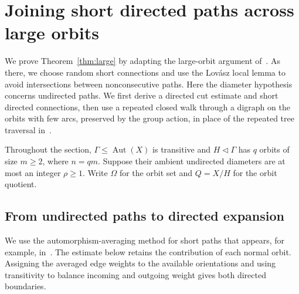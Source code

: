 \documentclass[11pt,a4paper,reqno]{amsart}
\theoremstyle{definition}
\theoremstyle{remark}
\numberwithin{equation}{section}
\DeclareMathOperator{\Aut}{Aut}
\begin{document}
\section{Joining short directed paths across large orbits}\label{sec:large}
We prove Theorem~\ref{thm:large} by adapting the large-orbit argument of~\cite[Lemmas 4.2, 4.5 and 4.6]{LiMethuku}. As there, we choose random short connections and use the Lov\'asz local lemma to avoid intersections between nonconsecutive paths. Here the diameter hypothesis concerns undirected paths. We first derive a directed cut estimate and short directed connections, then use a repeated closed walk through a digraph on the orbits with few arcs, preserved by the group action, in place of the repeated tree traversal in~\cite{LiMethuku}.

Throughout the section, $\Gamma\le\Aut(X)$ is transitive and $H\lhd\Gamma$ has $q$ orbits of size $m\ge2$, where $n=qm$. Suppose their ambient undirected diameters are at most an integer $\rho\ge1$. Write $\Omega$ for the orbit set and $Q=X/H$ for the orbit quotient.

\subsection{From undirected paths to directed expansion}
We use the automorphism-averaging method for short paths that appears, for example, in~\cite[Proposition 2.2]{Skresanov}. The estimate below retains the contribution of each normal orbit. Assigning the averaged edge weights to the available orientations and using transitivity to balance incoming and outgoing weight gives both directed boundaries.
\end{document}
